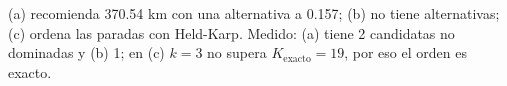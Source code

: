 {(a) recomienda 370.54 km con una alternativa a 0.157; (b) no tiene alternativas; (c) ordena las paradas con Held-Karp.}
{Medido: (a) tiene 2 candidatas no dominadas y (b) 1; en (c) $k = 3$ no supera $K_{\mathrm{exacto}} = 19$, por eso el orden es exacto.}
